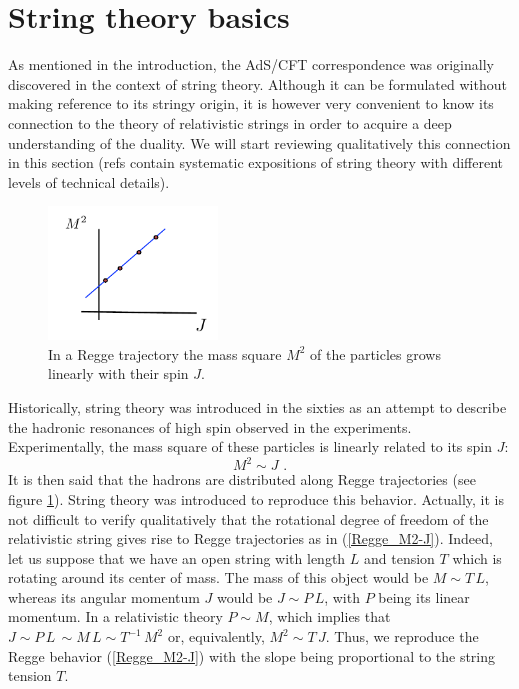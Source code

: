 \documentclass[12pt,notitlepage,a4paper]{article}
\newcommand{\beq}{\begin{equation}}
\newcommand{\eeq}{\end{equation}}
\begin{document}
\section{String theory basics}

As mentioned in the introduction, the AdS/CFT correspondence was originally discovered in the context of string theory. Although it can be formulated without making reference to its stringy origin, it is however very convenient to know its connection to the theory of relativistic strings in order to acquire a deep understanding of the duality. We will start reviewing qualitatively this connection in this section (refs \cite{GSW, Polchinski,BBM, Elias, Zwiebach,Ibanez_Uranga}  contain systematic expositions of string theory with different levels of technical details). 

\begin{figure}[ht]
\center
\includegraphics[width=0.4\textwidth]{Regge-trajectory.pdf}
\caption{In a Regge trajectory the mass square $M^2$ of the particles grows linearly with their spin $J$. } 
\label{Regge-trajectory}
\end{figure}





Historically, string theory was introduced in the sixties as an attempt to describe the hadronic resonances of high spin observed in the experiments. Experimentally, the mass square of these particles is linearly related to its spin $J$:
\beq
M^2\sim J\,\,.
\label{Regge_M2-J}
\eeq
It is  then said that the hadrons are distributed along Regge trajectories (see figure \ref{Regge-trajectory}). String theory was introduced to reproduce this behavior. Actually, it is not difficult to verify qualitatively that the rotational degree of freedom of the relativistic string gives rise to Regge trajectories  as in (\ref{Regge_M2-J}). Indeed, let us suppose that we have an open string with length $L$ and tension $T$ which is rotating around its center of mass. The mass of this object would be 
$M\sim T\,L$, whereas its angular momentum $J$ would be $J\sim P\,L$, with $P$ being its linear momentum. In a relativistic theory $P\sim M$, which implies that 
$J\sim P\,L\,\sim M\,L\sim T^{-1}\,M^2$ or, equivalently, $M^2\sim T\,J$. Thus, we reproduce the Regge behavior (\ref{Regge_M2-J}) with the slope being proportional to the string tension $T$. 
\end{document}
